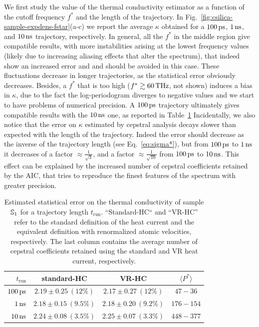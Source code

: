 We first study the value of the thermal conductivity estimator as a function of the cutoff frequency $f^*$ and the length of the trajectory. 
In Fig.~\ref{fig:csilica-sample-expdens-fstar}(a-c) we report the average $\kappa$ obtained for a $100\,\mathrm{ps}$, $1\,\mathrm{ns}$, and $10\,\mathrm{ns}$ trajectory, respectively. 
In general, all the $f^*$ in the middle region give compatible results, with more instabilities arising at the lowest frequency values (likely due to increasing aliasing effects that alter the spectrum), that indeed show an increased error and and should be avoided in this case. These fluctuations decrease in longer trajectories, as the statistical error obviously decreases. Besides, a $f^*$ that is too high ($f^*\gtrsim 60\,\mathrm{THz}$, not shown) induces a bias in $\kappa$, due to the fact the log-periodogram diverges to negative values and we start to have problems of numerical precision. 
A $100\,\mathrm{ps}$ trajectory ultimately gives compatible results with the $10\,\mathrm{ns}$ one, as reported in Table~\ref{tab:csilica-sample-kappa-cepstral}
Incidentally, we also notice that the error on $\kappa$ estimated by cepstral analysis decays slower than expected with the length of the trajectory. Indeed the error should decrease as the inverse of the trajectory length (see Eq.~\eqref{eq:sigma*}), but from $100\,\mathrm{ps}$ to $1\,\mathrm{ns}$ it decreases of a factor $\approx \frac{1}{\sqrt{3}}$, and a factor $\approx \frac{1}{\sqrt{10}}$ from $100\,\mathrm{ps}$ to $10\,\mathrm{ns}$. This effect can be explained by the increased number of cepstral coefficients retained by the AIC, that tries to reproduce the finest features of the spectrum with greater precision. 

\begin{table}[!tb]
    \centering
    \begin{tabular}{r|cc|c}
        $t_\mathrm{run}$ & \textbf{standard-HC} & \textbf{VR-HC} & \textbf{$\langle P^* \rangle$} \\
        \hline
        $100\,\mathrm{ps}$ & $2.19 \pm 0.25\: (12\%)$  & $2.17 \pm 0.27\: (12\%)$ & $47-36$\\
        $1\,\mathrm{ns}$   & $2.18 \pm 0.15\: (9.5\%)$ & $2.18 \pm 0.20\: (9.2\%)$ & $176-154$ \\
        $10\,\mathrm{ns}$  & $2.24 \pm 0.08\: (3.5\%)$ & $2.25 \pm 0.07\: (3.3\%)$ & $448-377$
    \end{tabular}
    \caption{Estimated statistical error on the thermal conductivity of sample $\S1$ for a trajectory length $t_\mathrm{run}$. ``Standard-HC`` and ``VR-HC'' refer to the standard definition of the heat current and the equivalent definition with renormalized atomic velocities, respectively. The last column contains the average number of cepstral coefficients retained using the standard and VR heat current, respectively. }
    \label{tab:csilica-sample-kappa-cepstral}
\end{table}

